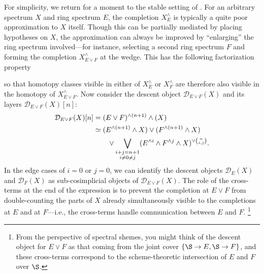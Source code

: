 For simplicity, we return for a moment to the stable setting of .
For an arbitrary spectrum \(X\) and ring spectrum \(E\), the completion \(X^\wedge_E\) is typically a quite poor approximation to \(X\) itself.
Though this can be partially mediated by placing hypotheses on \(X\), the approximation can always be improved by ``enlarging'' the ring spectrum involved---for instance, selecting a second ring spectrum \(F\) and forming the completion \(X^\wedge_{E \vee F}\) at the wedge.
This has the following factorization property
\begin{center}
\end{center}
so that homotopy classes visible in either of \(X^\wedge_E\) or \(X^\wedge_F\) are therefore also visible in the homotopy of \(X^\wedge_{E \vee F}\).
Now consider the descent object \(\mathcal D_{E \vee F}(X)\) and its layers \(\mathcal D_{E \vee F}(X)[n]\):
\begin{align*}
\mathcal D_{E \vee F}(X)[n] & = (E \vee F)^{\wedge (n+1)} \wedge (X) \\
& \simeq (E^{\wedge (n+1)} \wedge X) \vee (F^{\wedge (n+1)} \wedge X) \\
& \quad \quad \vee \bigvee_{\substack{i+j=n+1 \\ i \ne 0 \ne j}} (E^{\wedge i} \wedge F^{\wedge j} \wedge X)^{\vee \binom{n}{i,j}}.
\end{align*}
In the edge cases of \(i = 0\) or \(j = 0\), we can identify the descent objects \(\mathcal D_E(X)\) and \(\mathcal D_F(X)\) as sub-cosimplicial objects of \(\mathcal D_{E \vee F}(X)\).
The role of the cross-terms at the end of the expression is to prevent the completion at \(E \vee F\) from double-counting the parts of \(X\) already simultaneously visible to the completions at \(E\) and at \(F\)---i.e., the cross-terms handle communication between \(E\) and \(F\).%
\footnote{%
From the perspective of spectral shemes, you might think of the descent object for \(E \vee F\) as that coming from the joint cover \(\{\S \to E, \S \to F\}\), and these cross-terms correspond to the scheme-theoretic intersection of \(E\) and \(F\) over \(\S\).
}

